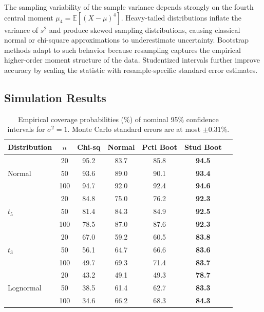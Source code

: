 \documentclass[12pt,a4paper]{article}
\begin{document}
The sampling variability of the sample variance depends strongly on the
fourth central moment $\mu_4=\mathbb{E}[(X-\mu)^4]$. Heavy-tailed
distributions inflate the variance of $s^2$ and produce skewed sampling
distributions, causing classical normal or chi-square approximations to
underestimate uncertainty. Bootstrap methods adapt to such behavior
because resampling captures the empirical higher-order moment structure
of the data. Studentized intervals further improve accuracy by scaling
the statistic with resample-specific standard error estimates.

\subsection{Simulation Results}

\begin{table}[htbp]
\centering
\caption{Empirical coverage probabilities (\%) of nominal 95\% confidence intervals for $\sigma^2=1$. Monte Carlo standard errors are at most $\pm0.31\%$.}
\label{tab:coverage}
\begin{threeparttable}
\begin{tabular}{lcccccc}
\toprule
Distribution & $n$ & Chi-sq & Normal & Pctl Boot & Stud Boot \\
\midrule
\multirow{3}{*}{Normal}
 & 20 & 95.2 & 83.7 & 85.8 & \textbf{94.5} \\
 & 50 & 93.6 & 89.0 & 90.1 & \textbf{93.4} \\
 & 100 & 94.7 & 92.0 & 92.4 & \textbf{94.6} \\
\midrule
\multirow{3}{*}{$t_5$}
 & 20 & 84.8 & 75.0 & 76.2 & \textbf{92.3} \\
 & 50 & 81.4 & 84.3 & 84.9 & \textbf{92.5} \\
 & 100 & 78.5 & 87.0 & 87.6 & \textbf{92.3} \\
\midrule
\multirow{3}{*}{$t_3$}
 & 20 & 67.0 & 59.2 & 60.5 & \textbf{83.8} \\
 & 50 & 56.1 & 64.7 & 66.6 & \textbf{83.6} \\
 & 100 & 49.7 & 69.3 & 71.4 & \textbf{83.7} \\
\midrule
\multirow{3}{*}{Lognormal}
 & 20 & 43.2 & 49.1 & 49.3 & \textbf{78.7} \\
 & 50 & 38.5 & 61.4 & 62.7 & \textbf{83.3} \\
 & 100 & 34.6 & 66.2 & 68.3 & \textbf{84.3} \\
\bottomrule
\end{tabular}
\end{threeparttable}
\end{table}
\end{document}
